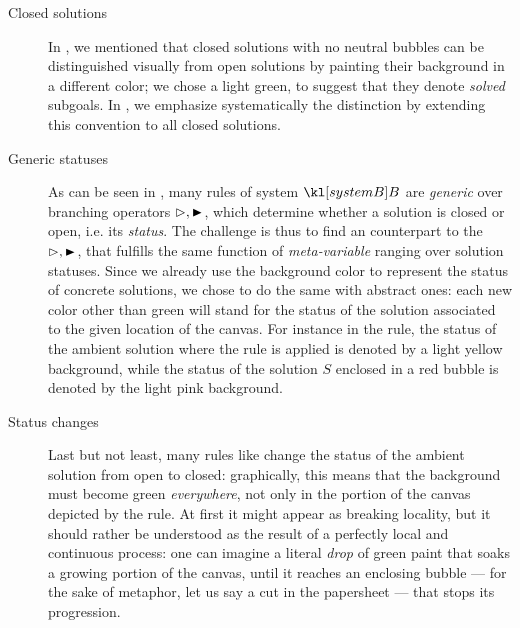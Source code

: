 \begin{description}
  \item[Closed solutions] In , we mentioned that closed
solutions with no neutral bubbles can be distinguished visually from open
solutions by painting their background in a different color; we chose a light
green, to suggest that they denote \emph{solved} subgoals. In
, we emphasize systematically the distinction by extending
this convention to all closed solutions.
  \item[Generic statuses] As can be seen in , many rules of
system $\sysB$ are \emph{generic} over branching operators $\J, \JB$, which
determine whether a solution is closed or open, i.e. its \emph{status}. The
challenge is thus to find an  counterpart to the  $\J, \JB$, that
fulfills the same function of \emph{meta-variable} ranging over solution
statuses. Since we already use the background color to represent the status of
concrete solutions, we chose to do the same with abstract ones: each new color
other than green will stand for the status of the solution associated to the
given location of the canvas. For instance in the 
rule, the status of the ambient solution where the rule is applied is denoted by
a light yellow background, while the status of the solution $S$ enclosed in a
red bubble is denoted by the light pink background.
  \item[Status changes] Last but not least, many rules like  change
the status of the ambient solution from open to closed: graphically, this means
that the background must become green \emph{everywhere}, not only in the portion
of the canvas depicted by the rule. At first it might appear as breaking
locality, but it should rather be understood as the result of a perfectly local
and continuous process: one can imagine a literal \emph{drop} of green paint
that soaks a growing portion of the canvas, until it reaches an enclosing bubble
--- for the sake of metaphor, let us say a cut in the papersheet --- that stops
its progression.
\end{description}

